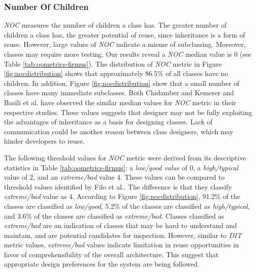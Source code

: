 \subsubsection{Number Of Children}
\textit{NOC} measures the number of children a class has. The greater number of children a class has, the greater potential of reuse, since inheritance is a form of reuse. However, large values of \textit{NOC} indicate a misuse of subclassing\cite{basili1996validation}. Moreover, classes may require more testing. Our results reveal a \textit{NOC} median value is 0 (see Table \ref{tab:oometrics-firmus}). The distribution of \textit{NOC} metric in Figure \ref{fig:nocdistribution} shows that approximately 86.5\% of all classes have no children. In addition, Figure \ref{fig:nocdistribution} show that a small number of classes have many immediate subclasses. Both Chidamber and Kemerer\cite{chidamber1994metrics} and Basili et al.\cite{basili1996validation} have observed the similar median values for \textit{NOC} metric in their respective studies. These values suggests that designer may not be fully exploiting the advantages of inheritance as a basis for designing classes. Lack of communication could be another reason between class designers, which may hinder developers to reuse.

The following threshold values for \textit{NOC} metric were derived from its descriptive statistics in Table \ref{tab:oometrics-firmus}: a \textit{low/good value} of 0, a \textit{high/typical} value of 2, and an \textit{extreme/bad} value 4. These values can be compared to threshold values identified by Filo et al.\cite{tarcisio}. The difference is that they classify \textit{extreme/bad} value as 4. According to Figure \ref{fig:nocdistribution}, 91.2\% of the classes are classified as \textit{low/good}, 5.2\% of the classes are classified as \textit{high/typical}, and 3.6\% of the classes are classified as \textit{extreme/bad}. Classes classified as \textit{extreme/bad} are an indication of classes that may be hard to understand and maintain, and are potential candidates for inspection. However, similar to \textit{DIT} metric values, \textit{extreme/bad} values indicate limitation in reuse opportunities in favor of comprehensibility of the overall architecture. This suggest that appropriate design preferences for the system are being followed. 


